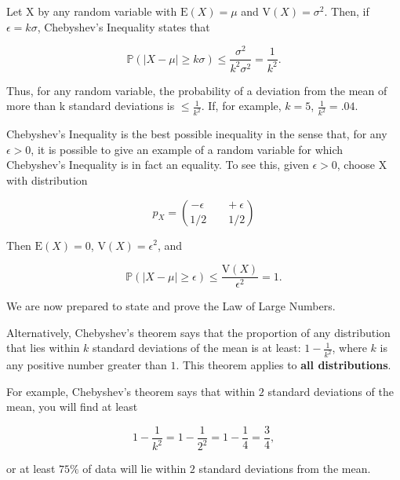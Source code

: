 \documentclass[12pt]{article}
\newcommand{\prob}[1]{\mathbb{P}(#1)}
\newcommand{\expected}[1]{\text{E}(#1)}
\newcommand{\variance}[1]{\text{V}(#1)}
\begin{document}
\begin{tcolorbox}
\noindent
Let X by any random variable with $\expected{X} = \mu$ and $\variance{X} = \sigma^2$. Then, if $\epsilon = k \sigma$, Chebyshev's Inequality states that

\begin{equation*}
\prob{\lvert X - \mu \rvert \geq k \sigma} \leq \frac{\sigma^2}{k^2 \sigma^2} = \frac{1}{k^2}.
\end{equation*}

\noindent
Thus, for any random variable, the probability of a deviation from the mean of
more than k standard deviations is $\leq \frac{1}{k^2}$. If, for example, $k = 5$, $\frac{1}{k^2} = .04$.

\vspace*{.5cm}
\noindent
Chebyshev’s Inequality is the best possible inequality in the sense that, for any
$\epsilon > 0$, it is possible to give an example of a random variable for which Chebyshev’s Inequality is in fact an equality. To see this, given $\epsilon > 0$, choose X with distribution 

\begin{equation*}
p_X = {- \epsilon \qquad  + \epsilon \choose 1/2 \qquad 1/2}
\end{equation*}

Then $\expected{X} = 0$, $\variance{X} = \epsilon^2$, and 

\begin{equation*}
\prob{\lvert X - \mu \rvert \geq \epsilon} \leq \frac{\variance{X}}{\epsilon^2} = 1.
\end{equation*}

We are now prepared to state and prove the Law of Large Numbers.
\end{tcolorbox}

\noindent
Alternatively, Chebyshev's theorem says that the proportion of any distribution that lies within $k$ standard deviations of the mean is at least: $1-\frac{1}{k^2}$, where $k$ is any positive number greater than $1$. This theorem applies to \textbf{all distributions}.

\begin{tcolorbox}
For example, Chebyshev's theorem says that within $2$ standard deviations of the mean, you will find at least

\begin{equation*}
1 - \frac{1}{k^2} = 1 - \frac{1}{2^2} = 1 - \frac{1}{4} = \frac{3}{4},
\end{equation*} 

\noindent
or at least $75\%$ of data will lie within $2$ standard deviations from the mean.
\end{tcolorbox}
\end{document}
